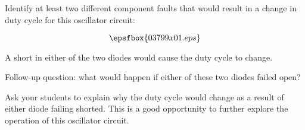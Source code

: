 

Identify at least two different component faults that would result in a change in duty cycle for this oscillator circuit:

$$\epsfbox{03799x01.eps}$$







A short in either of the two diodes would cause the duty cycle to change.

\vskip 10pt

Follow-up question: what would happen if either of these two diodes failed open?







Ask your students to explain why the duty cycle would change as a result of either diode failing shorted.  This is a good opportunity to further explore the operation of this oscillator circuit.




